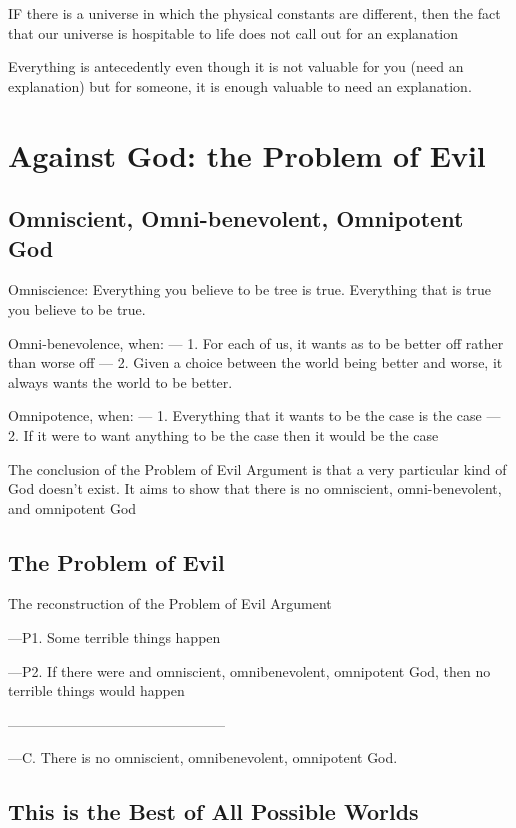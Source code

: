 \documentclass{article}
\begin{document}
IF there is a universe in which the physical constants are different, then the fact that our universe is hospitable to life does not call out for an explanation

Everything is antecedently even though it is not valuable for you (need an explanation) but for someone, it is enough valuable to need an explanation.

\section{Against God: the Problem of Evil}

\subsection{Omniscient, Omni-benevolent, Omnipotent God}

Omniscience: Everything you believe to be tree is true. Everything that is true you believe to be true.

Omni-benevolence, when:
--- 1. For each of us, it wants as to be better off rather than worse off
--- 2. Given a choice between the world being better and worse, it always wants the world to be better.

Omnipotence, when:
--- 1. Everything that it wants to be the case is the case
--- 2. If it were to want anything to be the case then it would be the case

The conclusion of the Problem of Evil Argument is that a very particular kind of God doesn't exist. It aims to show that there is no omniscient, omni-benevolent, and omnipotent God


\subsection{The Problem of Evil}
 
The reconstruction of the Problem of Evil Argument

---P1. Some terrible things happen

---P2. If there were and omniscient, omnibenevolent, omnipotent God, then no terrible things would happen

-----------------------------------------------

---C. There is no omniscient, omnibenevolent, omnipotent God.



\subsection{This is the Best of All Possible Worlds}
\end{document}
